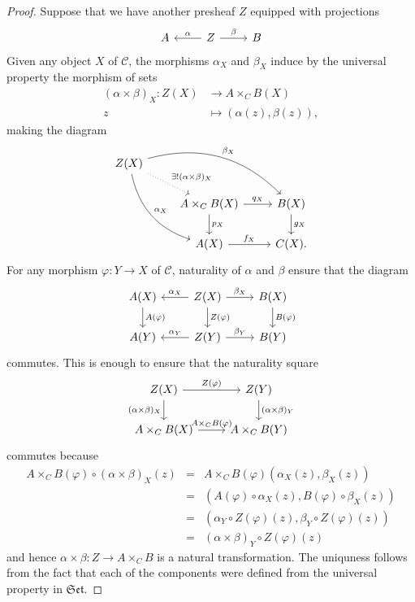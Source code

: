 \documentclass[10pt]{amsart}
\begin{document}
\begin{prop}
\begin{proof}
    Suppose that we have another presheaf $Z$ equipped with projections
    $$\begin{tikzcd}
      A & Z \arrow{r}{\beta} \arrow[swap]{l}{\alpha} & B
    \end{tikzcd}$$
    Given any object $X$ of $\mathscr{C}$, the morphisms $\alpha_X$ and $\beta_X$ induce by the universal property the morphism of sets
    \begin{align*}
      (\alpha \times \beta)_X \colon Z(X) &\rightarrow A \times_C B(X)\\
      z &\mapsto (\alpha(z), \beta(z)),
    \end{align*}
    making the diagram
    $$\begin{tikzcd}
      Z(X)\arrow[bend left]{rrd}{\beta_X}\arrow[bend right]{rdd}{\alpha_X} \arrow[dotted]{rd}{\exists !(\alpha \times \beta)_X} \\
      & A \times_C B(X) \arrow{r}{q_X}\arrow{d}{p_X} & B(X)\arrow{d}{g_X}\\
      & A(X) \arrow{r}{f_X} & C(X).
    \end{tikzcd}$$
    For any morphism $\varphi \colon Y \rightarrow X$ of $\mathscr{C}$, naturality of $\alpha$ and $\beta$ ensure that the diagram
    $$\begin{tikzcd}
      A(X)\arrow{d}{A(\varphi)} & Z(X)\arrow[swap]{l}{\alpha_X}\arrow{r}{\beta_X}\arrow{d}{Z(\varphi)} & B(X)\arrow{d}{B(\varphi)}\\
      A(Y) & Z(Y)\arrow[swap]{l}{\alpha_Y}\arrow{r}{\beta_Y} & B(Y)
    \end{tikzcd}$$
    commutes.
    This is enough to ensure that the naturality square
    $$\begin{tikzcd}
      Z(X) \arrow[swap]{d}{(\alpha \times \beta)_X}\arrow{r}{Z(\varphi)}& Z(Y)\arrow{d}{(\alpha \times \beta)_Y}\\
      A \times_C B(X) \arrow{r}{A \times_C B(\varphi)} & A \times_C B(Y)
    \end{tikzcd}$$
    commutes because
    \begin{eqnarray*}
      A \times_C B (\varphi) \circ (\alpha \times \beta)_X(z) &=& A \times_C B (\varphi)(\alpha_X(z), \beta_X(z))\\
      &=& (A(\varphi) \circ \alpha_X(z), B(\varphi) \circ \beta_X(z))\\
      &=& (\alpha_Y \circ Z(\varphi)(z), \beta_Y \circ Z(\varphi)(z))\\
      &=& (\alpha \times \beta)_Y \circ Z(\varphi)(z)
    \end{eqnarray*}
    and hence $\alpha \times \beta \colon Z \rightarrow A \times_C B$ is a natural transformation.
    The uniquness follows from the fact that each of the components were defined from the universal property in $\mathfrak{Set}$.
  \end{proof}
\end{prop}
\end{document}
